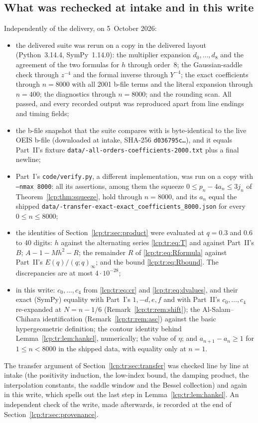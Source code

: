 \documentclass[11pt]{article}
\numberwithin{equation}{section}
\theoremstyle{definition}\newtheorem{definition}[theorem]{Definition}
\theoremstyle{remark}\newtheorem{remark}[theorem]{Remark}
\begin{document}
\subsection{What was rechecked at intake and in this write}\label{lcp:tr:sec:rechecked}
Independently of the delivery, on 5~October 2026:
\begin{itemize}[leftmargin=*,itemsep=0.15em]
\item the delivered suite was rerun on a copy in the delivered layout
 (Python~3.14.4, SymPy~1.14.0): the multiplier expansion
 $d_0,\ldots,d_8$ and the agreement of the two formulas for $h$ through
 order~8; the Gaussian-saddle check through $z^{-4}$ and the formal inverse
 through $Y^{-4}$; the exact coefficients through $n=8000$ with all 2001
 b-file terms and the literal expansion through $n=400$; the diagnostics
 through $n=8000$; and the rounding scan. All passed, and every recorded
 output was reproduced apart from line endings and timing fields;
\item the b-file snapshot that the suite compares with is byte-identical to
 the live OEIS b-file (downloaded at intake, SHA-256
 \texttt{d036795c\ldots}), and it equals Part~II's fixture
 \texttt{data/-all-orders-coefficients-2000.txt} plus a final
 newline;
\item Part~I's \texttt{code/verify.py}, a different implementation, was run
 on a copy with \texttt{--nmax 8000}: all its assertions, among them the
 squeeze $0\le p_n-4a_n\le3j_n$ of Theorem~\ref{lcp:thm:squeeze}, hold
 through $n=8000$, and its $a_n$ equal the shipped
 \texttt{data/-transfer-exact-exact\_coefficients\_8000.json}
 for every $0\le n\le8000$;
\item the identities of Section~\ref{lcp:tr:sec:product} were evaluated at
 $q=0.3$ and $0.6$ to 40 digits: $h$ against the alternating series
 \eqref{lcp:tr:eq:T} and against Part~II's $B$; $A-1-Mh^2-R$; the
 remainder $R$ of \eqref{lcp:tr:eq:Rformula} against Part~II's
 $E(q)/(q;q)_\infty$; and the bound \eqref{lcp:tr:eq:Rbound}. The
 discrepancies are at most $4\cdot10^{-28}$;
\item in this write: $c_0,\ldots,c_4$ from \eqref{lcp:tr:eq:cr} and
 \eqref{lcp:tr:eq:dvalues}, and their exact (SymPy) equality with Part~I's
 $1,-d,e,f$ and with Part~II's $c_0,\ldots,c_4$ re-expanded at
 $N=n-1/6$ (Remark~\ref{lcp:tr:rem:shift}); the Al-Salam--Chihara
 identification (Remark~\ref{lcp:tr:rem:asc}) against the basic
 hypergeometric definition; the contour identity behind
 Lemma~\ref{lcp:tr:lem:hankel}, numerically; the value of $\eta$; and
 $a_{n+1}-a_n\ge1$ for $1\le n<8000$ in the shipped data, with equality
 only at $n=1$.
\end{itemize}
The transfer argument of Section~\ref{lcp:tr:sec:transfer} was checked line
by line at intake (the positivity induction, the low-index bound, the
damping product, the interpolation constants, the saddle window and the
Bessel collection) and again in this write, which spells out the last step
in Lemma~\ref{lcp:tr:lem:hankel}. An independent check of the write, made
afterwards, is recorded at the end of Section~\ref{lcp:tr:sec:provenance}.
\end{document}
